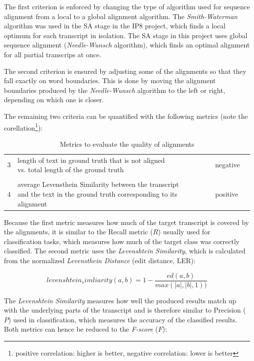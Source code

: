The first criterion is enforced by changing the type of algorithm used for sequence alignment from a local to a global alignment algorithm. The \textit{Smith-Waterman} algorithm was used in the \ac{SA} stage in the IP8 project, which finds a local optimum for each transcript in isolation. The \ac{SA} stage in this project uses global sequence alignment (\textit{Needle-Wunsch} algorithm), which finds an optimal alignment for all partial transcrips at once.

The second criterion is ensured by adjusting some of the alignments so that they fall exactly on word boundaries. This is done by moving the alignment boundaries produced by the \textit{Needle-Wunsch} algorithm to the left or right, depending on which one is closer. 

The remaining two criteria can be quantified with the following metrics (note the corellation\footnote{positive correlation: higher is better, negative correlation: lower is better}):

\begin{table}[!htbp]
	\centering
	\begin{tabular}{llll}
		\toprule
		\thead{criterion} & \thead{metric} & \thead{correlation} \\
		\midrule
		3 & \makecell[l]{length of text in ground truth that is not aligned\\vs. total length of the ground truth} & negative\\ \\ 	
		4 & \makecell[l]{average Levensthein Similarity between the transcript\\and the text in the ground truth corresponding to its alignment} & positive \\ 
		\bottomrule
	\end{tabular}
	\caption{Metrics to evaluate the quality of alignments}
	\label{alignment_quality}
\end{table}

Because the first metric measures how much of the target transcript is covered by the alignments, it is similar to the Recall metric ($R$) usually used for classification tasks, which measures how much of the target class was correctly classified. The second metric uses the \textit{Levenshtein Similarity}, which is calculated from the normalized \textit{Levensthein Distance} (edit distance, \ac{LER}):

\[ 
levenshtein_simliarity(a,b) = 1 - \frac{ed(a,b)}{max(|a|, |b|, 1))}
\]

The \textit{Levenshtein Similarity} measures how well the produced results match up with the underlying parts of the transcript and is therefore similar to Precision ($P$) used in classification, which measures the accuracy of the classified results. Both metrics can hence be reduced to the \textit{F-score} ($F$):

